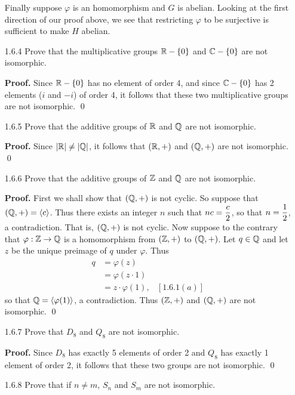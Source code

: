 \begin{enumerate}
      Finally suppose $\varphi$ is an homomorphism and $G$ is abelian. Looking
      at the first direction of our proof above, we see that restricting
      $\varphi$ to be surjective is sufficient to make $H$ abelian.
   \item[1.6.4]   Prove that the multiplicative groups $\mathbb{R} - \{0\}$ and
                  $\mathbb{C} - \{0\}$ are not isomorphic.

      \textbf{Proof.} Since $\mathbb{R} - \{0\}$ has no element of order 4, and since
      $\mathbb{C} - \{0\}$ has 2 elements ($i$ and $-i$) of order 4, it follows that
      these two multiplicative groups are not isomorphic. \qed
   \item[1.6.5]   Prove that the additive groups of $\mathbb{R}$ and $\mathbb{Q}$ are not
                  isomorphic.

      \textbf{Proof.} Since $|\mathbb{R}| \neq |\mathbb{Q}|$, it follows that $(\mathbb{R}, +)$ and
      $(\mathbb{Q}, +)$ are not isomorphic. \qed
   \item[1.6.6]   Prove that the additive groups of $\mathbb{Z}$ and $\mathbb{Q}$ are not
                  isomorphic.

      \textbf{Proof.} First we shall show that $(\mathbb{Q}, +)$ is not cyclic. So
      suppose that $(\mathbb{Q}, +) = \langle c \rangle$. Thus there exists an integer $n$ such 
      that $nc = \displaystyle\frac{c}{2}$, so that $\displaystyle n = \frac{1}{2}$, a contradiction. 
      That is, $(\mathbb{Q}, +)$ is not cyclic. Now suppose to the contrary that
      $\varphi : \mathbb{Z} \rightarrow \mathbb{Q}$ is a homomorphism from $(\mathbb{Z}, +)$ to
      $(\mathbb{Q}, +)$. Let $q \in \mathbb{Q}$ and let $z$ be the unique preimage of $q$ under
      $\varphi$. Thus
      \begin{align*}
         q &= \varphi(z) \\
           &= \varphi(z \cdot 1) \\
           &= z \cdot \varphi(1),  &[1.6.1(a)]
      \end{align*}
      so that $\mathbb{Q} = \langle \varphi(1) \rangle$, a contradiction. Thus $(\mathbb{Z}, +)$ and
      $(\mathbb{Q}, +)$ are not isomorphic. \qed
   \item[1.6.7]   Prove that $D_8$ and $Q_8$ are not isomorphic.

      \textbf{Proof.} Since $D_8$ has exactly 5 elements of order 2 and $Q_8$
      has exactly 1 element of order 2, it follows that these two groups are not
      isomorphic. \qed
   \item[1.6.8]   Prove that if $n \neq m$, $S_n$ and $S_m$ are not isomorphic.


\end{enumerate}
